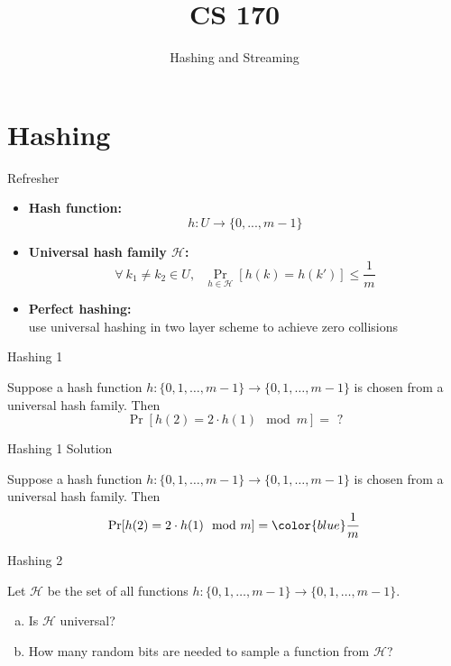 \documentclass[10pt]{beamer}
\title{CS 170}
\subtitle{Hashing and Streaming}
\date{}
\author{}
\institute{}
\begin{document}
\maketitle

\section{Hashing}

\begin{frame}{Refresher}

\begin{itemize}
\item \textbf{Hash function:}
$$h: U \to \{0, ..., m - 1\}$$
\item \textbf{Universal hash family $\mathcal{H}$:}
$$\forall~k_1 \neq k_2 \in U,\:\:\: \Pr_{h \in \mathcal{H}}[h(k) = h(k')] \leq \frac{1}{m}$$
\item \textbf{Perfect hashing:} \\
use universal hashing in two layer scheme to achieve zero collisions
\end{itemize}

\end{frame}

\begin{frame}{Hashing 1}

Suppose a hash function
$h: \{0, 1, \ldots, m - 1\} \to \{0, 1, \ldots, m - 1\}$
is chosen from a universal hash family. Then
$$\Pr[h(2) = 2 \cdot h(1) \mod m] = \text{ ?}$$

\end{frame}

\begin{frame}{Hashing 1 {\color{gray} Solution}}

Suppose a hash function
$h: \{0, 1, \ldots, m - 1\} \to \{0, 1, \ldots, m - 1\}$
is chosen from a universal hash family. Then
$$\Pr[h(2) = 2 \cdot h(1) \mod m] = {\color{blue} \frac{1}{m}}$$

\end{frame}

\begin{frame}{Hashing 2}

Let $\mathcal{H}$ be the set of all functions
$h: \{0, 1, \ldots, m - 1\} \to \{0, 1, \ldots, m - 1\}$.

\begin{enumerate}[(a)]
\item Is $\mathcal{H}$ universal?
\item How many random bits are needed to sample a function from $\mathcal{H}$?
\end{enumerate}

\end{frame}
\end{document}
